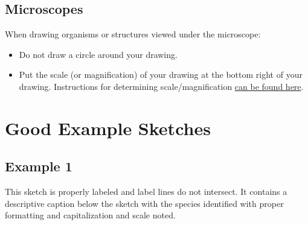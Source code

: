\documentclass[
]{book}
\providecommand{\tightlist}{%
  \setlength{\itemsep}{0pt}\setlength{\parskip}{0pt}}
\begin{document}
\hypertarget{microscopes}{%
\subsection*{Microscopes}\label{microscopes}}

When drawing organisms or structures viewed under the microscope:

\begin{itemize}
\tightlist
\item
  Do not draw a circle around your drawing.
\item
  Put the scale (or magnification) of your drawing at the bottom right of your drawing. Instructions for determining scale/magnification \href{a-magnification-of-a-drawing.html}{can be found here}.
\end{itemize}

\hypertarget{good-example-sketches}{%
\section{Good Example Sketches}\label{good-example-sketches}}

\hypertarget{example-1}{%
\subsection*{Example 1}\label{example-1}}

This sketch is properly labeled and label lines do not intersect. It contains a descriptive caption below the sketch with the species identified with proper formatting and capitalization and scale noted.
\end{document}
